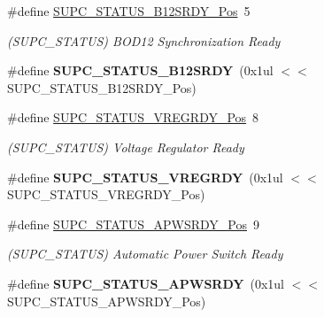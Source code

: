 \begin{DoxyCompactItemize}
\item 
\hypertarget{group___s_a_m_l21___s_u_p_c_gac3eabcbd2a183a2f7c170ad9b04ace0c}{}\#define \hyperlink{group___s_a_m_l21___s_u_p_c_gac3eabcbd2a183a2f7c170ad9b04ace0c}{S\+U\+P\+C\+\_\+\+S\+T\+A\+T\+U\+S\+\_\+\+B12\+S\+R\+D\+Y\+\_\+\+Pos}~5\label{group___s_a_m_l21___s_u_p_c_gac3eabcbd2a183a2f7c170ad9b04ace0c}

\begin{DoxyCompactList}\small\item\em (S\+U\+P\+C\+\_\+\+S\+T\+A\+T\+U\+S) B\+O\+D12 Synchronization Ready \end{DoxyCompactList}\item 
\hypertarget{group___s_a_m_l21___s_u_p_c_gaae3792e7ca953b6166454de7b2d76ff2}{}\#define {\bfseries S\+U\+P\+C\+\_\+\+S\+T\+A\+T\+U\+S\+\_\+\+B12\+S\+R\+D\+Y}~(0x1ul $<$$<$ S\+U\+P\+C\+\_\+\+S\+T\+A\+T\+U\+S\+\_\+\+B12\+S\+R\+D\+Y\+\_\+\+Pos)\label{group___s_a_m_l21___s_u_p_c_gaae3792e7ca953b6166454de7b2d76ff2}

\item 
\hypertarget{group___s_a_m_l21___s_u_p_c_ga450b4ee943dc677770fc3b4553280839}{}\#define \hyperlink{group___s_a_m_l21___s_u_p_c_ga450b4ee943dc677770fc3b4553280839}{S\+U\+P\+C\+\_\+\+S\+T\+A\+T\+U\+S\+\_\+\+V\+R\+E\+G\+R\+D\+Y\+\_\+\+Pos}~8\label{group___s_a_m_l21___s_u_p_c_ga450b4ee943dc677770fc3b4553280839}

\begin{DoxyCompactList}\small\item\em (S\+U\+P\+C\+\_\+\+S\+T\+A\+T\+U\+S) Voltage Regulator Ready \end{DoxyCompactList}\item 
\hypertarget{group___s_a_m_l21___s_u_p_c_ga4e94d2591081ee6401f74650537b4e96}{}\#define {\bfseries S\+U\+P\+C\+\_\+\+S\+T\+A\+T\+U\+S\+\_\+\+V\+R\+E\+G\+R\+D\+Y}~(0x1ul $<$$<$ S\+U\+P\+C\+\_\+\+S\+T\+A\+T\+U\+S\+\_\+\+V\+R\+E\+G\+R\+D\+Y\+\_\+\+Pos)\label{group___s_a_m_l21___s_u_p_c_ga4e94d2591081ee6401f74650537b4e96}

\item 
\hypertarget{group___s_a_m_l21___s_u_p_c_ga58fd6ff682c64679985a23829c79fe0b}{}\#define \hyperlink{group___s_a_m_l21___s_u_p_c_ga58fd6ff682c64679985a23829c79fe0b}{S\+U\+P\+C\+\_\+\+S\+T\+A\+T\+U\+S\+\_\+\+A\+P\+W\+S\+R\+D\+Y\+\_\+\+Pos}~9\label{group___s_a_m_l21___s_u_p_c_ga58fd6ff682c64679985a23829c79fe0b}

\begin{DoxyCompactList}\small\item\em (S\+U\+P\+C\+\_\+\+S\+T\+A\+T\+U\+S) Automatic Power Switch Ready \end{DoxyCompactList}\item 
\hypertarget{group___s_a_m_l21___s_u_p_c_ga1769ebf26985b65641731d57f6553f51}{}\#define {\bfseries S\+U\+P\+C\+\_\+\+S\+T\+A\+T\+U\+S\+\_\+\+A\+P\+W\+S\+R\+D\+Y}~(0x1ul $<$$<$ S\+U\+P\+C\+\_\+\+S\+T\+A\+T\+U\+S\+\_\+\+A\+P\+W\+S\+R\+D\+Y\+\_\+\+Pos)\label{group___s_a_m_l21___s_u_p_c_ga1769ebf26985b65641731d57f6553f51}


\end{DoxyCompactItemize}
